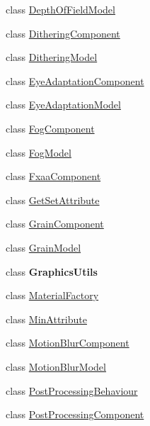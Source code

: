\begin{DoxyCompactItemize}
\item 
class \hyperlink{class_unity_engine_1_1_post_processing_1_1_depth_of_field_model}{Depth\+Of\+Field\+Model}
\item 
class \hyperlink{class_unity_engine_1_1_post_processing_1_1_dithering_component}{Dithering\+Component}
\item 
class \hyperlink{class_unity_engine_1_1_post_processing_1_1_dithering_model}{Dithering\+Model}
\item 
class \hyperlink{class_unity_engine_1_1_post_processing_1_1_eye_adaptation_component}{Eye\+Adaptation\+Component}
\item 
class \hyperlink{class_unity_engine_1_1_post_processing_1_1_eye_adaptation_model}{Eye\+Adaptation\+Model}
\item 
class \hyperlink{class_unity_engine_1_1_post_processing_1_1_fog_component}{Fog\+Component}
\item 
class \hyperlink{class_unity_engine_1_1_post_processing_1_1_fog_model}{Fog\+Model}
\item 
class \hyperlink{class_unity_engine_1_1_post_processing_1_1_fxaa_component}{Fxaa\+Component}
\item 
class \hyperlink{class_unity_engine_1_1_post_processing_1_1_get_set_attribute}{Get\+Set\+Attribute}
\item 
class \hyperlink{class_unity_engine_1_1_post_processing_1_1_grain_component}{Grain\+Component}
\item 
class \hyperlink{class_unity_engine_1_1_post_processing_1_1_grain_model}{Grain\+Model}
\item 
class {\bfseries Graphics\+Utils}
\item 
class \hyperlink{class_unity_engine_1_1_post_processing_1_1_material_factory}{Material\+Factory}
\item 
class \hyperlink{class_unity_engine_1_1_post_processing_1_1_min_attribute}{Min\+Attribute}
\item 
class \hyperlink{class_unity_engine_1_1_post_processing_1_1_motion_blur_component}{Motion\+Blur\+Component}
\item 
class \hyperlink{class_unity_engine_1_1_post_processing_1_1_motion_blur_model}{Motion\+Blur\+Model}
\item 
class \hyperlink{class_unity_engine_1_1_post_processing_1_1_post_processing_behaviour}{Post\+Processing\+Behaviour}
\item 
class \hyperlink{class_unity_engine_1_1_post_processing_1_1_post_processing_component}{Post\+Processing\+Component}
\item 

\end{DoxyCompactItemize}
